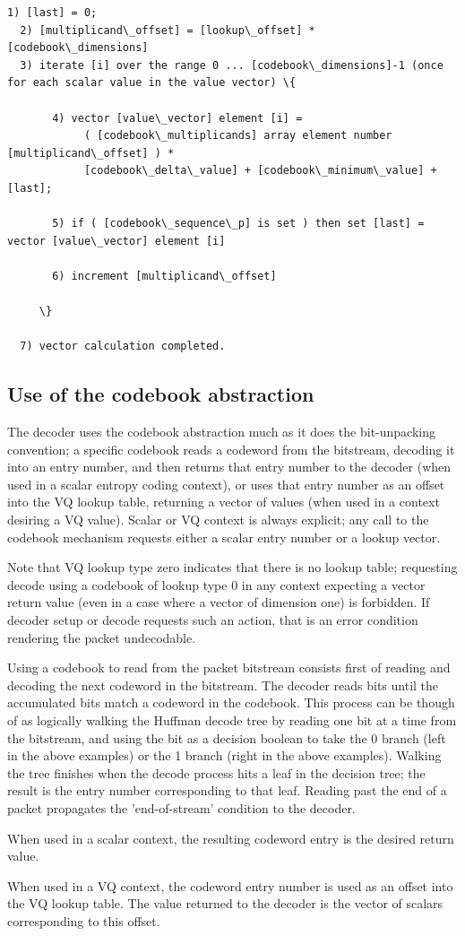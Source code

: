 \begin{Verbatim}[commandchars=\\\{\}]
  1) [last] = 0;
  2) [multiplicand\_offset] = [lookup\_offset] * [codebook\_dimensions]
  3) iterate [i] over the range 0 ... [codebook\_dimensions]-1 (once for each scalar value in the value vector) \{

       4) vector [value\_vector] element [i] =
            ( [codebook\_multiplicands] array element number [multiplicand\_offset] ) *
            [codebook\_delta\_value] + [codebook\_minimum\_value] + [last];

       5) if ( [codebook\_sequence\_p] is set ) then set [last] = vector [value\_vector] element [i]

       6) increment [multiplicand\_offset]

     \}

  7) vector calculation completed.
\end{Verbatim}









\subsection{Use of the codebook abstraction}

The decoder uses the codebook abstraction much as it does the
bit-unpacking convention; a specific codebook reads a
codeword from the bitstream, decoding it into an entry number, and then
returns that entry number to the decoder (when used in a scalar
entropy coding context), or uses that entry number as an offset into
the VQ lookup table, returning a vector of values (when used in a context
desiring a VQ value). Scalar or VQ context is always explicit; any call
to the codebook mechanism requests either a scalar entry number or a
lookup vector.

Note that VQ lookup type zero indicates that there is no lookup table;
requesting decode using a codebook of lookup type 0 in any context
expecting a vector return value (even in a case where a vector of
dimension one) is forbidden.  If decoder setup or decode requests such
an action, that is an error condition rendering the packet
undecodable.

Using a codebook to read from the packet bitstream consists first of
reading and decoding the next codeword in the bitstream. The decoder
reads bits until the accumulated bits match a codeword in the
codebook.  This process can be though of as logically walking the
Huffman decode tree by reading one bit at a time from the bitstream,
and using the bit as a decision boolean to take the 0 branch (left in
the above examples) or the 1 branch (right in the above examples).
Walking the tree finishes when the decode process hits a leaf in the
decision tree; the result is the entry number corresponding to that
leaf.  Reading past the end of a packet propagates the 'end-of-stream'
condition to the decoder.

When used in a scalar context, the resulting codeword entry is the
desired return value.

When used in a VQ context, the codeword entry number is used as an
offset into the VQ lookup table.  The value returned to the decoder is
the vector of scalars corresponding to this offset.
